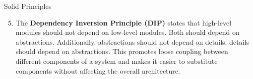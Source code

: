 \begin{frame}
    \begin{content}{Solid Principles}
        \begin{enumerate}
            \setcounter{enumi}{4}
            \item The \textbf{Dependency Inversion Principle (DIP)} states that high-level modules should not depend on low-level modules. Both should depend on abstractions. Additionally, abstractions should not depend on details; details should depend on abstractions. This promotes loose coupling between different components of a system and makes it easier to substitute components without affecting the overall architecture.
        \end{enumerate}
    \end{content}
\end{frame}